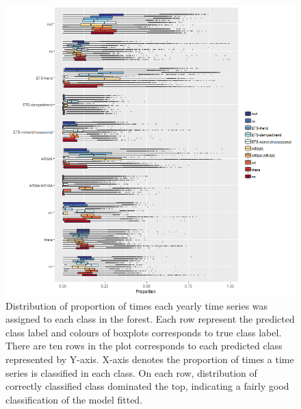 \documentclass[11pt,a4paper,]{article}
\theoremstyle{definition}
\theoremstyle{definition}
\theoremstyle{definition}
\theoremstyle{remark}
\begin{document}
\begin{figure}
\centering
\includegraphics{figures/yearlyoob-1.png}
\caption{\label{fig:yearlyoob}Distribution of proportion of times each
yearly time series was assigned to each class in the forest. Each row
represent the predicted class label and colours of boxplots corresponds
to true class label. There are ten rows in the plot corresponds to each
predicted class represented by Y-axis. X-axis denotes the proportion of
times a time series is classified in each class. On each row,
distribution of correctly classified class dominated the top, indicating
a fairly good classification of the model fitted.}
\end{figure}
\end{document}
